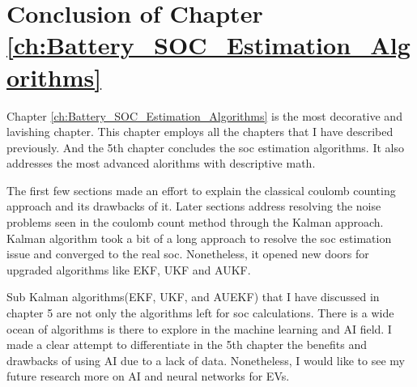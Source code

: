 \section*{Conclusion of Chapter \ref{ch:Battery_SOC_Estimation_Algorithms}}

Chapter \ref{ch:Battery_SOC_Estimation_Algorithms} is the most decorative and lavishing chapter. This chapter employs all the chapters that I have described previously. And the 5th chapter concludes the soc estimation algorithms. It also addresses the most advanced alorithms with descriptive math.

The first few sections made an effort to explain the classical coulomb counting approach and its drawbacks of it. Later sections address resolving the noise problems seen in the coulomb count method through the Kalman approach. Kalman algorithm took a bit of a long approach to resolve the soc estimation issue and converged to the real soc. Nonetheless, it opened new doors for upgraded algorithms like EKF, UKF and AUKF.

Sub Kalman algorithms(EKF, UKF, and AUEKF) that I have discussed in chapter 5 are not only the algorithms left for soc calculations. There is a wide ocean of algorithms is there to explore in the machine learning and AI field. I made a clear attempt to differentiate in the 5th chapter the benefits and drawbacks of using AI due to a lack of data. Nonetheless, I would like to see my future research more on AI and neural networks for EVs.